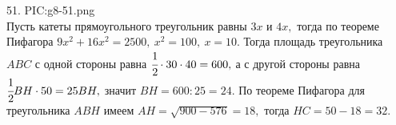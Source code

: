 51. {{PIC:g8-51.png}}\\
Пусть катеты прямоугольного треугольник равны $3x$ и $4x,$ тогда по теореме Пифагора $9x^2+16x^2=2500,\ x^2=100,\ x=10.$ Тогда площадь треугольника $ABC$ с одной стороны равна $\cfrac{1}{2}\cdot30\cdot40=600,$ а с другой стороны равна $\cfrac{1}{2}BH\cdot50=25BH,$ значит $BH=600:25=24.$ По теореме Пифагора для треугольника $ABH$ имеем $AH=\sqrt{900-576}=18,$ тогда $HC=50-18=32.$\\
